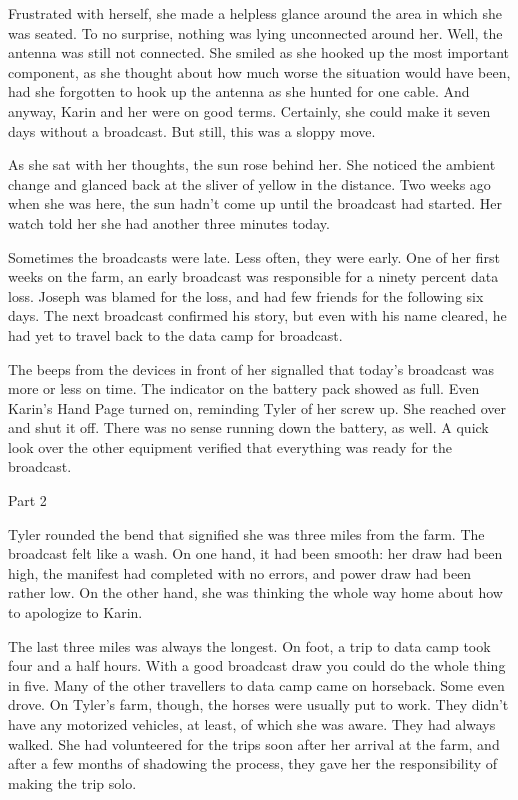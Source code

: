 Frustrated with herself, she made a helpless glance around the area in which
she was seated. To no surprise, nothing was lying unconnected around her. Well,
the antenna was still not connected. She smiled as she hooked up the most
important component, as she thought about how much worse the situation would
have been, had she forgotten to hook up the antenna as she hunted for one
cable. And anyway, Karin and her were on good terms. Certainly, she could make
it seven days without a broadcast. But still, this was a sloppy move.

As she sat with her thoughts, the sun rose behind her. She noticed the ambient
change and glanced back at the sliver of yellow in the distance. Two weeks ago
when she was here, the sun hadn't come up until the broadcast had started. Her
watch told her she had another three minutes today.

Sometimes the broadcasts were late. Less often, they were early. One of her
first weeks on the farm, an early broadcast was responsible for a ninety percent data loss.
Joseph was blamed for the loss, and had few friends for the following six days.
The next broadcast confirmed his story, but even with his name cleared,
he had yet to travel back to the data camp for broadcast.

The beeps from the devices in front of her signalled that today's broadcast
was more or less on time. The indicator on the battery pack showed as full.
Even Karin's Hand Page turned on, reminding Tyler of her screw up. She reached
over and shut it off. There was no sense running down the battery, as well.
A quick look over the other equipment verified that everything was ready
for the broadcast.



Part 2

Tyler rounded the bend that signified she was three miles from the farm. The
broadcast felt like a wash. On one hand, it had been smooth: her draw
had been high, the manifest had completed with no errors, and power draw had
been rather low. On the other hand, she was thinking the whole way home about
how to apologize to Karin.

The last three miles was always the longest. On foot, a trip to data camp took
four and a half hours. With a good broadcast draw you could do the whole thing
in five. Many of the other travellers to data camp came on horseback. Some even
drove. On Tyler's farm, though, the horses were usually put to work. They didn't
have any motorized vehicles, at least, of which she was aware. They had always
walked. She had volunteered for the trips soon after her arrival at the farm, and
after a few months of shadowing the process, they gave her the responsibility
of making the trip solo.

